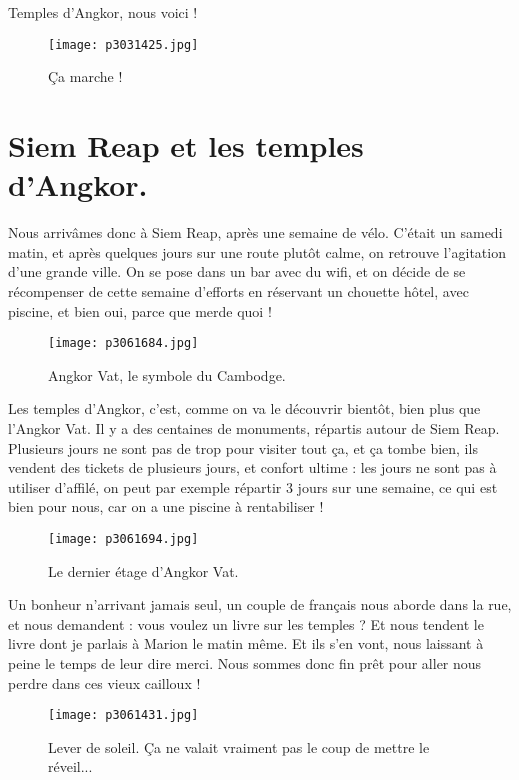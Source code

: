 \documentclass{book}
\begin{document}
Temples d'Angkor, nous voici !


\begin{figure}[h]
\centering
\texttt{[image: p3031425.jpg]}
\caption*{Ça marche !}
\end{figure}



\chapter{Siem Reap et les temples d'Angkor.}
Nous arrivâmes donc à Siem Reap, après une semaine de vélo. C'était un samedi matin, et après quelques jours sur une route plutôt calme, on retrouve l'agitation d'une grande ville. On se pose dans un bar avec du wifi, et on décide de se récompenser de cette semaine d'efforts en réservant un chouette hôtel, avec piscine, et bien oui,  parce que merde quoi !


\begin{figure}[h]
\centering
\texttt{[image: p3061684.jpg]}
\caption*{Angkor Vat, le symbole du Cambodge.}
\end{figure}

Les temples d'Angkor, c'est, comme on va le découvrir bientôt, bien plus que l'Angkor Vat. Il y a des centaines de monuments, répartis autour de Siem Reap. Plusieurs jours ne sont pas de trop pour visiter tout ça, et ça tombe bien, ils vendent des tickets de plusieurs jours, et confort ultime : les jours ne sont pas à utiliser d'affilé, on peut par exemple répartir 3 jours sur une semaine, ce qui est bien pour nous, car on a une piscine à rentabiliser !


\begin{figure}[h]
\centering
\texttt{[image: p3061694.jpg]}
\caption*{Le dernier étage d'Angkor Vat.}
\end{figure}

Un bonheur n'arrivant jamais seul, un couple de français nous aborde dans la rue, et nous demandent : vous voulez un livre sur les temples ? Et nous tendent le livre dont je parlais à Marion le matin même. Et ils s'en vont, nous laissant à peine le temps de leur dire merci. Nous sommes donc fin prêt pour aller nous perdre dans ces vieux cailloux !


\begin{figure}[h]
\centering
\texttt{[image: p3061431.jpg]}
\caption*{Lever de soleil. Ça ne valait vraiment pas le coup de mettre le réveil...}
\end{figure}
\end{document}

